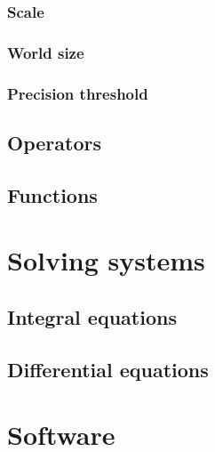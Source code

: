 \documentclass[../master_thesis.tex]{subfiles}
\begin{document}
\subsubsection{Scale}
\subsubsection{World size}
\subsubsection{Precision threshold}
\subsection{Operators}
\subsection{Functions}
\section{Solving systems}
\subsection{Integral equations}
\subsection{Differential equations}
\section{Software}

\biblio
\end{document}
